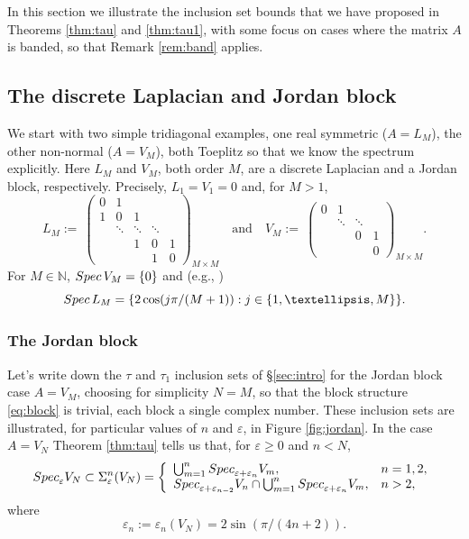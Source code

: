 \documentclass[preprint,1p,11pt]{elsarticle}
\newcommand\N{{\mathbb N}}
\newcommand\eps{{\varepsilon}}
\newcommand\Spec{{\rm Spec}\,}  %
\newcommand\Specn{{\rm Spec}}   %
\newcommand\Speps{{\rm Spec}_\eps}
\numberwithin{equation}{section}   %
\numberwithin{figure}{section}  %
\begin{document}
In this section we illustrate the inclusion set bounds that we have proposed in Theorems \ref{thm:tau} and \ref{thm:tau1}, with some  focus on cases where the matrix $A$ is banded, so that Remark \ref{rem:band} applies.

\subsection{The discrete Laplacian and Jordan block} \label{sec:disLap}

We start with two simple tridiagonal examples, one real symmetric ($A=L_M$), the other non-normal ($A=V_M$), both Toeplitz so that we know the spectrum explicitly. Here $L_M$ and $V_M$, both order $M$, are  a discrete Laplacian and a Jordan block, respectively. Precisely, $L_1=V_1=0$ and, for $M>1$,
$$
L_M :=\ \left(\begin{array}{ccccc}0&1\\
1&0&1\\
&\ddots&\ddots&\ddots\\
&&1&0&1\\
&&&1&0
\end{array}\right)_{M\times M}  
\quad \mbox{and} \quad
V_M :=\ \left(\begin{array}{cccc}0&1\\
&\ddots&\ddots\\
&&0&1\\
&&&0
\end{array}\right)_{M\times M} .
$$
For $M\in \N$, $\Spec V_M=\{0\}$ and (e.g., \cite{BoeGru}) 
\begin{equation} \label{eq:DLS}
\Spec L_M= \{2\cos(j\pi/(M+1)):j\in \{1,\ldots,M\}\}.
\end{equation}

\subsubsection{The Jordan block} \label{sec:jordan}
Let's write down the $\tau$ and $\tau_1$ inclusion sets of \S\ref{sec:intro} for the Jordan block case  $A=V_M$, choosing for simplicity $N=M$, so that the block structure \eqref{eq:block} is trivial, each block a single complex number. These inclusion sets are illustrated, for particular values of $n$ and $\eps$, in Figure \ref{fig:jordan}.
In the case $A=V_N$ Theorem \ref{thm:tau} tells us that, for $\eps\geq 0$ and $n<N$,
\begin{equation} \label{eq:SpepsVN}
\Speps V_N\subset \Sigma_\eps^n(V_N) = \left\{\begin{array}{ll}\bigcup_{m=1}^n  \Specn_{\eps+ \eps_{n}}V_m, & n=1,2,\\
\Specn_{\eps+ \eps_{n-2}} V_n \cap \bigcup_{m=1}^n  \Specn_{\eps+ \eps_{n}}V_m, & n>2,\end{array}\right. 
\end{equation}
where
$$
\eps_n := \eps_n(V_N) = 2\sin(\pi/(4n+2)).
$$
\end{document}
